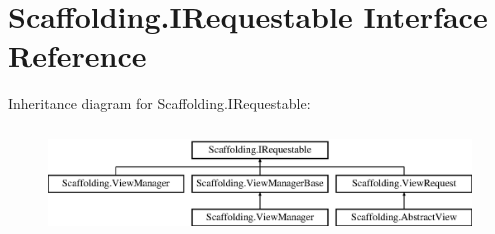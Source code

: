 \hypertarget{interface_scaffolding_1_1_i_requestable}{\section{Scaffolding.\+I\+Requestable Interface Reference}
\label{interface_scaffolding_1_1_i_requestable}
}
Inheritance diagram for Scaffolding.\+I\+Requestable\+:\begin{figure}[H]
\begin{center}
\leavevmode
\includegraphics[height=2.871795cm]{interface_scaffolding_1_1_i_requestable}
\end{center}
\end{figure}
